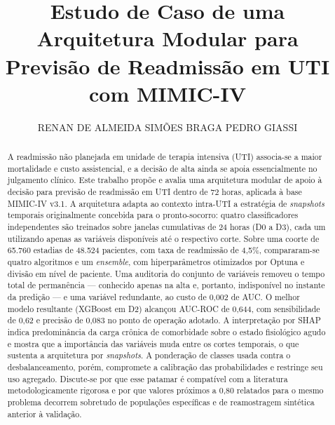 \documentclass{ieeeaccess}
\begin{document}
\title{Estudo de Caso de uma Arquitetura Modular para Previsão de Readmissão em UTI com MIMIC-IV}
\author{
    \uppercase{Renan de Almeida Simões Braga}
    \uppercase{Pedro Giassi}
}
\address[1]{Instituto Federal de Educação, Ciência e
Tecnologia de Santa Catarina, Florianópolis, SC 88020-300 Brasil (e-mail: renan.asb1989@aluno.ifsc.edu.br, pedro.giassi@ifsc.edu.br)}


\begin{abstract}
A readmissão não planejada em unidade de terapia intensiva (UTI) associa-se a maior mortalidade e custo assistencial, e a decisão de alta ainda se apoia essencialmente no julgamento clínico. Este trabalho propõe e avalia uma arquitetura modular de apoio à decisão para previsão de readmissão em UTI dentro de 72 horas, aplicada à base MIMIC-IV v3.1. A arquitetura adapta ao contexto intra-UTI a estratégia de \textit{snapshots} temporais originalmente concebida para o pronto-socorro: quatro classificadores independentes são treinados sobre janelas cumulativas de 24 horas (D0 a D3), cada um utilizando apenas as variáveis disponíveis até o respectivo corte. Sobre uma coorte de 65.760 estadias de 48.524 pacientes, com taxa de readmissão de 4,5\%, compararam-se quatro algoritmos e um \textit{ensemble}, com hiperparâmetros otimizados por Optuna e divisão em nível de paciente. Uma auditoria do conjunto de variáveis removeu o tempo total de permanência --- conhecido apenas na alta e, portanto, indisponível no instante da predição --- e uma variável redundante, ao custo de 0,002 de AUC. O melhor modelo resultante (XGBoost em D2) alcançou AUC-ROC de 0,644, com sensibilidade de 0,62 e precisão de 0,083 no ponto de operação adotado. A interpretação por SHAP indica predominância da carga crônica de comorbidade sobre o estado fisiológico agudo e mostra que a importância das variáveis muda entre os cortes temporais, o que sustenta a arquitetura por \textit{snapshots}. A ponderação de classes usada contra o desbalanceamento, porém, compromete a calibração das probabilidades e restringe seu uso agregado. Discute-se por que esse patamar é compatível com a literatura metodologicamente rigorosa e por que valores próximos a 0,80 relatados para o mesmo problema decorrem sobretudo de populações específicas e de reamostragem sintética anterior à validação.
\end{abstract}
\end{document}
